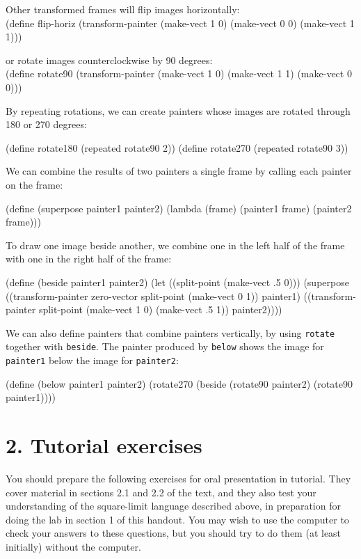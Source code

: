 \documentclass[11pt]{article}
\begin{document}
Other transformed frames will flip images horizontally:\\
\beginlisp
(define flip-horiz
  (transform-painter (make-vect 1 0)
                     (make-vect 0 0)
                     (make-vect 1 1)))
\endlisp

\noindent
or rotate images counterclockwise by 90 degrees:\\
\beginlisp
(define rotate90
  (transform-painter (make-vect 1 0)
                     (make-vect 1 1)
                     (make-vect 0 0)))
\endlisp

By repeating rotations, we can create painters whose images are
rotated through 180 or 270 degrees:

\beginlisp
(define rotate180 (repeated rotate90 2))
(define rotate270 (repeated rotate90 3))
\endlisp

We can combine the results of two painters a single frame by
calling each painter on the frame:

\beginlisp
(define (superpose painter1 painter2)
  (lambda (frame)
    (painter1 frame)
    (painter2 frame)))
\endlisp

To draw one image beside another, we combine one in the left half
of the frame with one in the right half of the frame:

\beginlisp
(define (beside painter1 painter2)
  (let ((split-point (make-vect .5 0)))
    (superpose
     ((transform-painter zero-vector
                         split-point
                         (make-vect 0 1))
      painter1)
     ((transform-painter split-point
                         (make-vect 1 0)
                         (make-vect .5 1))
      painter2))))

\endlisp

We can also define painters that combine painters vertically, by
using {\tt rotate} together with {\tt beside}.  The painter produced
by {\tt below} shows the image for {\tt painter1} below the image
for {\tt painter2}:

\beginlisp
(define (below painter1 painter2)
  (rotate270 (beside (rotate90 painter2)
                     (rotate90 painter1))))
\endlisp

\section{2. Tutorial exercises}

You should prepare the following exercises for oral presentation in
tutorial.  They cover material in sections 2.1 and 2.2 of the text,
and they also test your understanding of the square-limit language
described above, in preparation for doing the lab in section 1 of
this handout.  You may wish to use the computer to check your answers
to these questions, but you should try to do them (at least
initially) without the computer.
\end{document}
